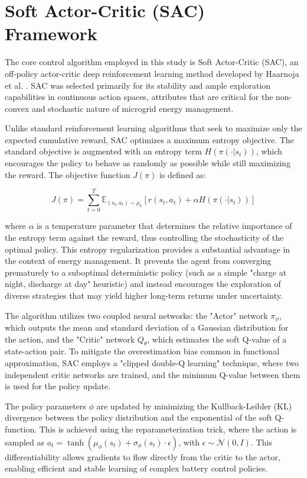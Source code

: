 
\section{Soft Actor-Critic (SAC) Framework}

The core control algorithm employed in this study is Soft Actor-Critic (SAC), an off-policy actor-critic deep reinforcement learning method developed by Haarnoja et al. \cite{Haarnoja2018}. SAC was selected primarily for its stability and ample exploration capabilities in continuous action spaces, attributes that are critical for the non-convex and stochastic nature of microgrid energy management.

Unlike standard reinforcement learning algorithms that seek to maximize only the expected cumulative reward, SAC optimizes a maximum entropy objective. The standard objective is augmented with an entropy term $H(\pi(\cdot|s_t))$, which encourages the policy to behave as randomly as possible while still maximizing the reward. The objective function $J(\pi)$ is defined as:

\begin{equation}
    J(\pi) = \sum_{t=0}^{T} \mathbb{E}_{(s_t, a_t) \sim \rho_\pi} \left[ r(s_t, a_t) + \alpha H(\pi(\cdot|s_t)) \right]
\end{equation}

where $\alpha$ is a temperature parameter that determines the relative importance of the entropy term against the reward, thus controlling the stochasticity of the optimal policy. This entropy regularization provides a substantial advantage in the context of energy management. It prevents the agent from converging prematurely to a suboptimal deterministic policy (such as a simple "charge at night, discharge at day" heuristic) and instead encourages the exploration of diverse strategies that may yield higher long-term returns under uncertainty.

The algorithm utilizes two coupled neural networks: the "Actor" network $\pi_\phi$, which outputs the mean and standard deviation of a Gaussian distribution for the action, and the "Critic" network $Q_\theta$, which estimates the soft Q-value of a state-action pair. To mitigate the overestimation bias common in functional approximation, SAC employs a "clipped double-Q learning" technique, where two independent critic networks are trained, and the minimum Q-value between them is used for the policy update.

The policy parameters $\phi$ are updated by minimizing the Kullback-Leibler (KL) divergence between the policy distribution and the exponential of the soft Q-function. This is achieved using the reparameterization trick, where the action is sampled as $a_t = \tanh(\mu_\phi(s_t) + \sigma_\phi(s_t) \cdot \epsilon)$, with $\epsilon \sim \mathcal{N}(0, I)$. This differentiability allows gradients to flow directly from the critic to the actor, enabling efficient and stable learning of complex battery control policies.
